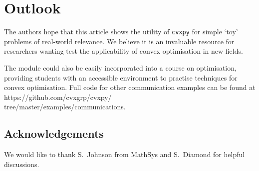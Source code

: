\documentclass[twocolumn,secnumarabic,amssymb, nobibnotes, aps, prl,superscriptaddress]{revtex4-1}
\begin{document}
\section{Outlook}
\noindent The authors hope that this article shows the utility of \texttt{cvxpy} for simple `toy' problems of real-world relevance. We believe it is an invaluable resource for researchers wanting test the applicability of convex optimisation in new fields. 

The module could also be easily incorporated into a course on optimisation, providing students with an accessible environment to practise techniques for convex optimisation. Full code for other communication examples can be found at https://github.com/cvxgrp/cvxpy/\\tree/master/examples/communications.



\subsection*{Acknowledgements}
We would like to thank S.~Johnson from MathSys and S.~Diamond for helpful discussions. 

\vspace{0.2cm}
 


\end{document}
